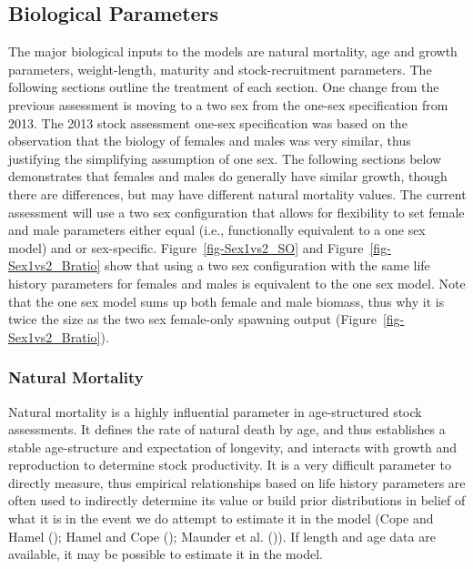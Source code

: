\documentclass[
]{scrartcl}
\begin{document}
\subsection{Biological Parameters}\label{biological-parameters}

The major biological inputs to the models are natural mortality, age and
growth parameters, weight-length, maturity and stock-recruitment
parameters. The following sections outline the treatment of each
section. One change from the previous assessment is moving to a two sex
from the one-sex specification from 2013. The 2013 stock assessment
one-sex specification was based on the observation that the biology of
females and males was very similar, thus justifying the simplifying
assumption of one sex. The following sections below demonstrates that
females and males do generally have similar growth, though there are
differences, but may have different natural mortality values. The
current assessment will use a two sex configuration that allows for
flexibility to set female and male parameters either equal (i.e.,
functionally equivalent to a one sex model) and or sex-specific.
Figure~\ref{fig-Sex1vs2_SO} and Figure~\ref{fig-Sex1vs2_Bratio} show
that using a two sex configuration with the same life history parameters
for females and males is equivalent to the one sex model. Note that the
one sex model sums up both female and male biomass, thus why it is twice
the size as the two sex female-only spawning output
(Figure~\ref{fig-Sex1vs2_Bratio}).

\subsubsection{Natural Mortality}\label{natural-mortality}

Natural mortality is a highly influential parameter in age-structured
stock assessments. It defines the rate of natural death by age, and thus
establishes a stable age-structure and expectation of longevity, and
interacts with growth and reproduction to determine stock productivity.
It is a very difficult parameter to directly measure, thus empirical
relationships based on life history parameters are often used to
indirectly determine its value or build prior distributions in belief of
what it is in the event we do attempt to estimate it in the model (Cope
and Hamel (); Hamel and Cope
(); Maunder et al.
()). If length and age data are
available, it may be possible to estimate it in the model.
\end{document}
